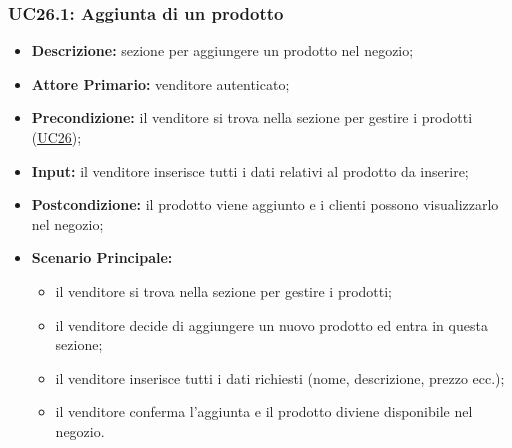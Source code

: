 \subsubsection{UC26.1: Aggiunta di un prodotto}
\label{sec:UC26.1}
\begin{itemize}
    \item \textbf{Descrizione:} sezione per aggiungere un prodotto nel negozio;
    \item \textbf{Attore Primario:} venditore autenticato;
    \item \textbf{Precondizione:} il venditore si trova nella sezione per gestire i prodotti (\hyperref[sec:UC26]{\underline{UC26}});
    \item \textbf{Input:} il venditore inserisce tutti i dati relativi al prodotto da inserire;
    \item \textbf{Postcondizione:} il prodotto viene aggiunto e i clienti possono visualizzarlo nel negozio;
    \item \textbf{Scenario Principale:}
          \begin{itemize}
              \item il venditore si trova nella sezione per gestire i prodotti;
              \item il venditore decide di aggiungere un nuovo prodotto ed entra in questa sezione;
              \item il venditore inserisce tutti i dati richiesti (nome, descrizione, prezzo ecc.);
              \item il venditore conferma l'aggiunta e il prodotto diviene disponibile nel negozio.
          \end{itemize}
\end{itemize}
